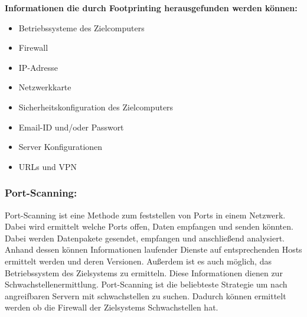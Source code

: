 \par\bigbreak
\textbf{Informationen die durch Footprinting herausgefunden werden können:}
\begin{itemize}
    \item Betriebssysteme des Zielcomputers\bigbreak
    \item Firewall\bigbreak
    \item IP-Adresse\bigbreak
    \item Netzwerkkarte\bigbreak
    \item Sicherheitskonfiguration des Zielcomputers\bigbreak
    \item Email-ID und/oder Passwort\bigbreak
    \item Server Konfigurationen\bigbreak
    \item URLs und VPN\bigbreak
\end{itemize}
\cite{ref_url14}

\subsubsection{Port-Scanning:}
Port-Scanning ist eine Methode zum feststellen von Ports in einem Netzwerk. Dabei wird ermittelt welche Ports offen, Daten empfangen und senden könnten. Dabei werden Datenpakete gesendet, empfangen und anschließend analysiert. Anhand dessen können Informationen laufender Dienste auf entsprechenden Hosts ermittelt werden und deren Versionen. Außerdem ist es auch möglich, das Betriebssystem des Zielsystems zu ermitteln. Diese Informationen dienen zur Schwachstellenermittlung. Port-Scanning ist die beliebteste Strategie um nach angreifbaren Servern mit schwachstellen zu suchen. Dadurch können ermittelt werden ob die Firewall der Zielsystems Schwachstellen hat.\cite{ref_url15}\cite{ref_url16}

